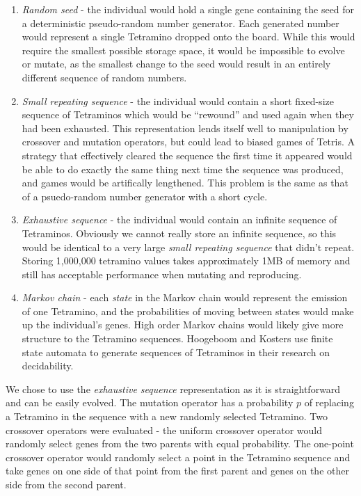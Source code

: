 \documentclass[a4paper,11pt]{article}
\begin{document}
\label{individualtype}
\begin{enumerate}
  \item \emph{Random seed} - the individual would hold a single gene containing
      the seed for a deterministic pseudo-random number generator.
      Each generated number would represent a single Tetramino dropped onto the
      board.
      While this would require the smallest possible storage space, it would be
      impossible to evolve or mutate, as the smallest change to the seed would
      result in an entirely different sequence of random numbers.
  \item \emph{Small repeating sequence} - the individual would contain a short
      fixed-size sequence of Tetraminos which would be ``rewound'' and used
      again when they had been exhausted.
      This representation lends itself well to manipulation by crossover and
      mutation operators, but could lead to biased games of Tetris.
      A strategy that effectively cleared the sequence the first time it
      appeared would be able to do exactly the same thing next time the
      sequence was produced, and games would be artifically lengthened.
      This problem is the same as that of a psuedo-random number generator with
      a short cycle.
  \item \emph{Exhaustive sequence} - the individual would contain an infinite
      sequence of Tetraminos.
      Obviously we cannot really store an infinite sequence, so this would be
      identical to a very large \emph{small repeating sequence} that didn't
      repeat.
      Storing 1,000,000 tetramino values takes approximately 1MB of memory and
      still has acceptable performance when mutating and reproducing.
  \item \emph{Markov chain} - each \emph{state} in the Markov chain would
      represent the emission of one Tetramino, and the probabilities of moving
      between states would make up the individual's genes.
      High order Markov chains would likely give more structure to the
      Tetramino sequences.
      Hoogeboom and Kosters \cite{hoogeboom2004tetris} use finite state
      automata to generate sequences of Tetraminos in their research on
      decidability.
\end{enumerate}

We chose to use the \emph{exhaustive sequence} representation as it is
straightforward and can be easily evolved.
The mutation operator has a probability $p$ of replacing a Tetramino in the
sequence with a new randomly selected Tetramino.
Two crossover operators were evaluated - the uniform crossover operator would
randomly select genes from the two parents with equal probability.
The one-point crossover operator would randomly select a point in the Tetramino
sequence and take genes on one side of that point from the first parent and
genes on the other side from the second parent.
\end{document}
